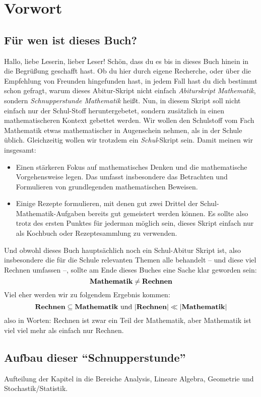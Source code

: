 \chapter{Vorwort}

\section{Für wen ist dieses Buch?}
Hallo, liebe Leserin, lieber Leser! Schön, dass du es bis in dieses Buch hinein in die Begrüßung geschafft hast. Ob du hier durch eigene Recherche, oder über die Empfehlung von Freunden hingefunden hast, in jedem Fall hast du dich bestimmt schon gefragt, warum dieses Abitur-Skript nicht einfach \textit{Abiturskript Mathematik}, sondern \textit{Schnupperstunde Mathematik} heißt. Nun, in diesem Skript soll nicht einfach nur der Schul-Stoff heruntergebetet, sondern zusätzlich in einen mathematischeren Kontext gebettet werden. Wir wollen den Schulstoff vom Fach Mathematik etwas mathematischer in Augenschein nehmen, als in der Schule üblich. Gleichzeitig wollen wir trotzdem ein \textit{Schul}-Skript sein. Damit meinen wir insgesamt: 
\begin{itemize}
    \item Einen stärkeren Fokus auf mathematisches Denken und die mathematische Vorgehensweise legen. Das umfasst insbesondere das Betrachten und Formulieren von grundlegenden mathematischen Beweisen. 
    \item Einige Rezepte formulieren, mit denen gut zwei Drittel der Schul-Mathematik-Aufgaben bereits gut gemeistert werden können. Es sollte also trotz des ersten Punktes für jederman möglich sein, dieses Skript einfach nur als Kochbuch oder Rezeptesammlung zu verwenden. 
\end{itemize}
Und obwohl dieses Buch hauptsächlich noch ein Schul-Abitur Skript ist, also insbesondere die für die Schule relevanten Themen alle behandelt -- und diese viel Rechnen umfassen --, sollte am Ende dieses Buches eine Sache klar geworden sein: 
\begin{equation*}
    \hbox{\textbf{Mathematik}} \neq \hbox{\textbf{Rechnen}}
\end{equation*}
Viel eher werden wir zu folgendem Ergebnis kommen: 
\begin{equation*}
    \hbox{\textbf{Rechnen}} \subseteq \hbox{\textbf{Mathematik} und } |\hbox{\textbf{Rechnen}}| \ll |\hbox{\textbf{Mathematik}}|
\end{equation*}
also in Worten: Rechnen ist zwar ein Teil der Mathematik, aber Mathematik ist viel viel mehr als einfach nur Rechnen. 

\section{Aufbau dieser "`Schnupperstunde"'}
Aufteilung der Kapitel in die Bereiche Analysis, Lineare Algebra, Geometrie und Stochastik/Statistik. 
